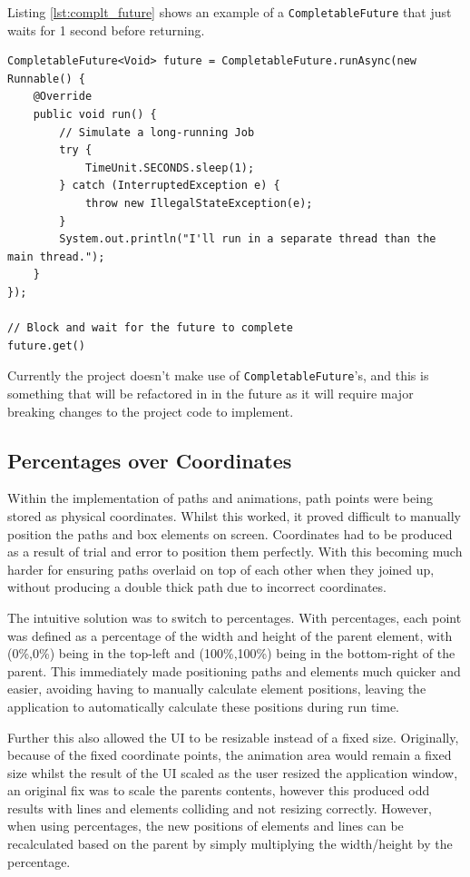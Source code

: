 Listing \ref{lst:complt_future} shows an example of a \texttt{CompletableFuture} that just waits for 1 second before returning.

\begin{lstlisting}[caption=Example completable future code from CalliCoder.com \cite{singh_2022_java}, label=lst:complt_future]
CompletableFuture<Void> future = CompletableFuture.runAsync(new Runnable() {
    @Override
    public void run() {
        // Simulate a long-running Job
        try {
            TimeUnit.SECONDS.sleep(1);
        } catch (InterruptedException e) {
            throw new IllegalStateException(e);
        }
        System.out.println("I'll run in a separate thread than the main thread.");
    }
});

// Block and wait for the future to complete
future.get()
\end{lstlisting}

Currently the project doesn't make use of \texttt{CompletableFuture}'s, and this is something that will be refactored in in the future as it will require major breaking changes to the project code to implement.

\subsection{Percentages over Coordinates}
Within the implementation of paths and animations, path points were being stored as physical coordinates. Whilst this worked, it proved difficult to manually position the paths and box elements on screen. Coordinates had to be produced as a result of trial and error to position them perfectly. With this becoming much harder for ensuring paths overlaid on top of each other when they joined up, without producing a double thick path due to incorrect coordinates.

The intuitive solution was to switch to percentages. With percentages, each point was defined as a percentage of the width and height of the parent element, with (0\%,0\%) being in the top-left and (100\%,100\%) being in the bottom-right of the parent. This immediately made positioning paths and elements much quicker and easier, avoiding having to manually calculate element positions, leaving the application to automatically calculate these positions during run time.

Further this also allowed the \ac{UI} to be resizable instead of a fixed size. Originally, because of the fixed coordinate points, the animation area would remain a fixed size whilst the result of the \ac{UI} scaled as the user resized the application window, an original fix was to scale the parents contents, however this produced odd results with lines and elements colliding and not resizing correctly. However, when using percentages, the new positions of elements and lines can be recalculated based on the parent by simply multiplying the width/height by the percentage.

